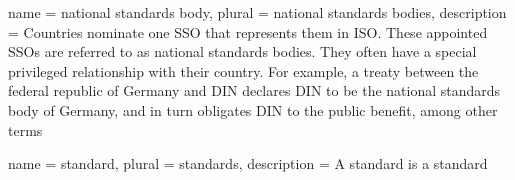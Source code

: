 

\usepackage{xparse}
 {
}



 { name = {national standards body}, plural =
  {national standards bodies}, description = {Countries nominate one
    \gls{SSO} that represents them in \gls{ISO}. These appointed
    \glspl{SSO} are referred to as national standards bodies. They
    often have a special privileged relationship with their
    country. For example, a treaty between the federal republic of
    Germany and DIN declares DIN to be the national standards body of
    Germany, and in turn obligates DIN to the public benefit, among
    other terms}}

 { name = {standard}, plural =
  {standards}, description = {
    A standard is a standard}
}

